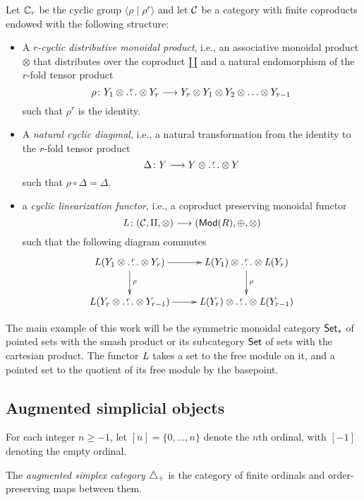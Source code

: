 Let $\mathbb{C}_r$ be the cyclic group $\langle\rho\mid \rho^r\rangle$ and let $\mathcal{C}$ be a category with finite coproducts endowed with the following structure:
\begin{itemize}
	\item A \emph{$r$-cyclic distributive monoidal product}, i.e., an associative monoidal product $\otimes$ that distributes over the coproduct $\amalg$ and a natural endomorphism of the $r$-fold tensor product
	\[
	\rho\colon Y_1\otimes  \overset{r}{\ldots}\otimes Y_r\longrightarrow Y_r\otimes Y_1\otimes Y_2\otimes \ldots \otimes Y_{r-1}
	\]
	such that $\rho^r$ is the identity.
	\item A \emph{natural cyclic diagonal}, i.e., a natural transformation from the identity to the $r$-fold tensor product
	\[
	\Delta\colon Y\longrightarrow Y\otimes \overset{r}{\ldots}\otimes Y
	\]
	such that $\rho\circ \Delta = \Delta$.
	\item a \emph{cyclic linearization functor}, i.e., a coproduct preserving monoidal functor
	\[
	\operatorname{{\it L}}\colon (\mathcal{C},\amalg,\otimes)\longrightarrow (\mathsf{Mod}(R),\oplus,\otimes)
	\]
	such that the following diagram commutes
	\[
	\xymatrix{
		L(Y_1\otimes \overset{r}{\ldots} \otimes Y_r)  \ar[r]\ar[d]^{\rho} & \abel(Y_1)\otimes \overset{r}{\ldots} \otimes \abel(Y_r)\ar[d]^{\rho} \\
		L(Y_{r}\otimes \overset{r}{\ldots} \otimes Y_{r-1})  \ar[r] & \abel(Y_r)\otimes \overset{r}{\ldots} \otimes \abel(Y_{r-1}) }
	\]
\end{itemize}
The main example of this work will be the symmetric monoidal category $\mathsf{Set}_*$ of pointed sets with the smash product or its subcategory $\mathsf{Set}$ of sets with the cartesian product. The functor $\operatorname{{\it L}}$ takes a set to the free module on it, and a pointed set to the quotient of its free module by the basepoint.

\subsection{Augmented simplicial objects}\label{s:simplices}

For each integer $n\geq -1$, let $[n] = \{0,\ldots,n\}$ denote the $n$th ordinal, with $[-1]$ denoting the empty ordinal.

\begin{definition}
	The \emph{augmented simplex category} $\triangle_{+}$ is the category of finite ordinals and order-preserving maps between them. %
\end{definition}

